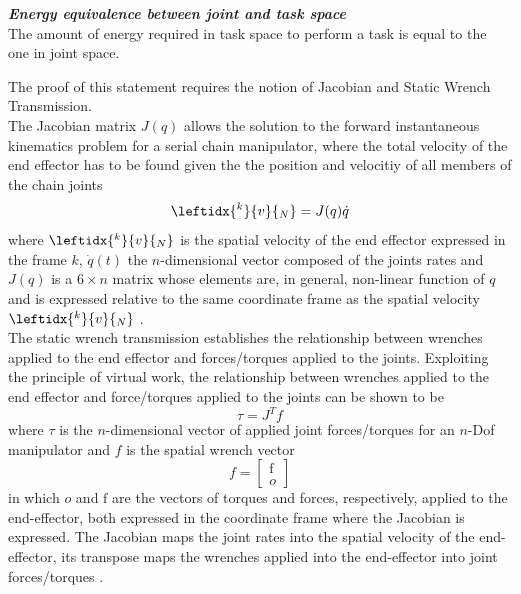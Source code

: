 \begin{theorem}\label{Energy_equivalence}
	\emph{\textbf{Energy equivalence between joint and task space}}\\
	The amount of energy required in task space to perform a task is equal to the one in joint space.
\end{theorem}
The proof of this statement requires the notion of Jacobian and  Static Wrench Transmission.\\
The Jacobian matrix $J(q)$ allows the solution to the forward instantaneous kinematics problem for a serial chain manipulator, where the total velocity of the end effector has to be found given the  the position and velocitiy of all members of the chain joints
\begin{equation}\label{Jacobian}
	\leftidx{^k}{v}{_{N}} = J(q)\dot{q}
\end{equation}
where $\leftidx{^k}{v}{_{N}}$ is the spatial velocity of the end effector expressed in the frame $k$, $\dot{q}(t)$ the $n$-dimensional vector composed of the joints rates and $J(q)$ is a $6 \times n$ matrix whose elements are, in general, non-linear function of $q$ and is expressed relative to the same coordinate frame as the spatial velocity $\leftidx{^k}{v}{_{N}}$ \cite{Siciliano:2007:SHR:1209344}.\\
The static wrench transmission establishes the relationship between wrenches applied to the end effector and forces/torques applied to the joints.
Exploiting the principle of virtual work, the relationship between wrenches applied to the end effector and force/torques applied to the joints can be shown to be
\begin{equation}\label{jForce}
	\tau = J^{T} f
\end{equation}			
where $\tau$ is the $n$-dimensional vector of applied joint forces/torques for an $n$-Dof manipulator and $f$ is the spatial wrench vector
\begin{equation}
f =  \begin{bmatrix}
\mathrm{f}\\ o
\end{bmatrix}
\end{equation}				
in which $o$ and $\mathrm{f}$ are the vectors of torques and forces, respectively, applied to the end-effector, both expressed in the coordinate frame where the Jacobian is expressed. The Jacobian maps the joint rates into the spatial velocity of the end-effector, its transpose maps the wrenches applied into the end-effector into joint forces/torques \cite{Siciliano:2007:SHR:1209344}.
